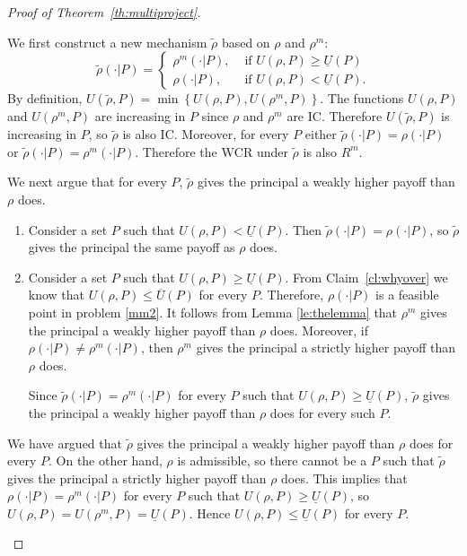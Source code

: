 \documentclass[12pt,english]{article}
\newcommand{\overU}{{\overline{U}}}
\newcommand{\underU}{{\underline{U}}}
\theoremstyle{remark}
\newenvironment{proofof}[1]{\begin{proof}[Proof of #1]}{\end{proof}}
\theoremstyle{plain}
\theoremstyle{definition}
\newcommand{\wcr}{\mathrm{WCR}}
\begin{document}
\begin{proofof}{Theorem~\ref{th:multiproject}}
\begin{enumerate}
We first construct a new mechanism $\tilde\rho$ based on $\rho$ and $\rho^m$:
  \[
  \tilde\rho(\cdot|P)=\begin{cases}\rho^m(\cdot|P),&\text{ if }U(\rho,P)\geqslant \underU(P) \\\rho(\cdot|P),&\text{ if }U(\rho,P)<\underU(P).\end{cases}\]
  By definition, $U(\tilde\rho,P)=\min\left\{U(\rho,P),U(\rho^m,P)\right\}$. 
  The functions $U(\rho,P)$ and $U(\rho^m,P)$ are increasing in $P$ since $\rho$ and $\rho^m$ are IC. Therefore $U(\tilde\rho,P)$ is increasing in $P$, so $\tilde\rho$ is also IC. Moreover, for every $P$ either $\tilde \rho(\cdot|P)=\rho(\cdot|P)$ or $\tilde \rho(\cdot|P)=\rho^m(\cdot|P)$. Therefore the $\wcr$ under $\tilde\rho$ is also $R^m$.

We next argue that for every $P$, $\tilde \rho$ gives the principal a weakly higher payoff than $\rho$ does. 
\begin{enumerate}
\vspace{-0.35cm} \item Consider a set $P$ such that $U(\rho,P)<\underU(P)$. Then $  \tilde\rho(\cdot|P)=  \rho(\cdot|P)$, so $\tilde \rho$ gives the principal the same payoff as $\rho$ does. 
\vspace{-0.35cm} \item Consider a set $P$ such that $U(\rho,P) \geqslant \underU(P)$. From Claim~\ref{cl:whyover} we know that $U(\rho,P)\leqslant \overU(P)$ for every $P$. Therefore, $\rho(\cdot|P)$ is a feasible point in problem \eqref{mm2}. It follows from Lemma \ref{le:thelemma} that $\rho^m$ gives the principal a weakly higher payoff than $\rho$ does. Moreover, if $\rho(\cdot|P) \neq \rho^m (\cdot|P)$, then $\rho^m$ gives the principal a strictly higher payoff than $\rho$ does. 

Since $\tilde \rho(\cdot|P)=\rho^m(\cdot|P)$ for every $P$ such that $U(\rho,P) \geqslant \underU(P)$, $\tilde \rho$ gives the principal a weakly higher payoff than $\rho$ does for every such $P$. 
\end{enumerate}
We have argued that $\tilde \rho$ gives the principal a weakly higher payoff than $\rho$ does for every $P$. On the other hand, $\rho$ is admissible, so there cannot be a $P$ such that $\tilde \rho$ gives the principal a strictly higher payoff than $\rho$ does. This implies that $\rho(\cdot|P)=\rho^m (\cdot|P)$ for every $P$ such that $U(\rho,P) \geqslant \underU(P)$, so $U(\rho,P)=U(\rho^m,P)=\underU(P)$. Hence $U(\rho,P) \leqslant \underU(P)$ for every $P$. 
\end{enumerate}
\end{proofof}
\end{document}
